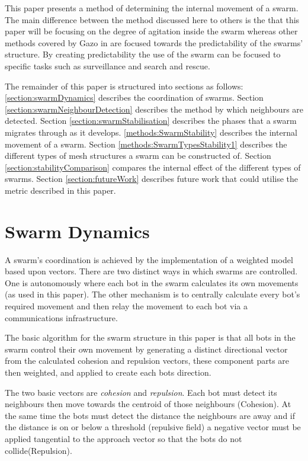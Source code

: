 \documentclass[10pt,journal,letterpaper,twoside]{IEEEtran}
\newcommand{\stability}{internal movement}
\begin{document}
This paper presents a method of determining the \stability{} of a swarm. The main difference between the method discussed here to others \cite{VGKP02} \cite{XCFPLLHF06} is the that this paper will be focusing on the degree of agitation inside the swarm whereas other methods covered by Gazo in \cite{VGKP11} are focused towards the predictability of the swarms' structure. By creating predictability the use of the swarm can be focused to specific tasks such as surveillance and search and rescue.

The remainder of this paper is structured into sections as follows: \ref{section:swarmDynamics} describes the coordination of swarms. Section \ref{section:swarmNeighbourDetection} describes the method by which neighbours are detected. Section \ref{section:swarmStabilisation} describes the phases that a swarm migrates through as it develops. \ref{methods:SwarmStability} describes the internal movement of a swarm. Section \ref{methods:SwarmTypesStability1} describes the different types of mesh structures a swarm can be constructed of. Section \ref{section:stabilityComparison} compares the internal effect of the different types of swarms. Section \ref{section:futureWork} describes future work that could utilise the metric described in this paper.

\section{Swarm Dynamics\label{section:swarmDynamics}}

A swarm's coordination is achieved by the implementation of a weighted model based upon vectors. There are two distinct ways in which swarms are controlled. One is autonomously where each bot in the swarm calculates its own movements (as used in this paper). The other mechanism is to centrally calculate every bot's required movement and then relay the movement to each bot via a communications infrastructure.

The basic algorithm for the swarm structure in this paper is that all bots in the swarm control their own movement by generating a distinct directional vector from the calculated cohesion and repulsion vectors, these component parts are then weighted, and applied to create each bots direction.

The two basic vectors are \emph{cohesion} and \emph{repulsion}. Each bot must detect its neighbours then move towards the centroid of those neighbours (Cohesion). At the same time the bots must detect the distance the neighbours are away and if the distance is on or below a threshold (repulsive field) a negative vector must be applied tangential to the approach vector so that the bots do not collide(Repulsion).
\end{document}
